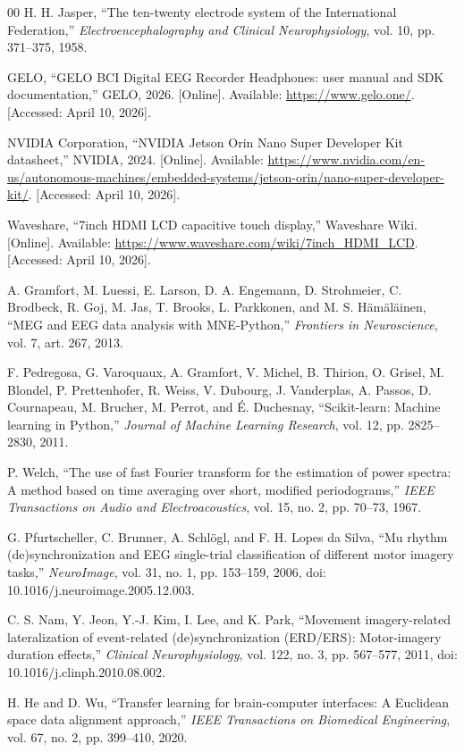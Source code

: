 \begin{thebibliography}{00}
H. H. Jasper, ``The ten-twenty electrode system of the International Federation,''
\textit{Electroencephalography and Clinical Neurophysiology}, vol. 10,
pp. 371--375, 1958.


GELO, ``GELO BCI Digital EEG Recorder Headphones: user manual and SDK
documentation,'' GELO, 2026. [Online]. Available: \url{https://www.gelo.one/}.
[Accessed: April 10, 2026].

NVIDIA Corporation, ``NVIDIA Jetson Orin Nano Super Developer Kit datasheet,'' NVIDIA,
2024. [Online]. Available:
\url{https://www.nvidia.com/en-us/autonomous-machines/embedded-systems/jetson-orin/nano-super-developer-kit/}.
[Accessed: April 10, 2026].


Waveshare, ``7inch HDMI LCD capacitive touch display,'' Waveshare Wiki. [Online].
Available: \url{https://www.waveshare.com/wiki/7inch_HDMI_LCD}.
[Accessed: April 10, 2026].

A. Gramfort, M. Luessi, E. Larson, D. A. Engemann, D. Strohmeier, C. Brodbeck,
R. Goj, M. Jas, T. Brooks, L. Parkkonen, and M. S. H\"{a}m\"{a}l\"{a}inen,
``MEG and EEG data analysis with MNE-Python,'' \textit{Frontiers in Neuroscience},
vol. 7, art. 267, 2013.

F. Pedregosa, G. Varoquaux, A. Gramfort, V. Michel, B. Thirion, O. Grisel,
M. Blondel, P. Prettenhofer, R. Weiss, V. Dubourg, J. Vanderplas, A. Passos,
D. Cournapeau, M. Brucher, M. Perrot, and \'{E}. Duchesnay, ``Scikit-learn:
Machine learning in Python,'' \textit{Journal of Machine Learning Research},
vol. 12, pp. 2825--2830, 2011.


P. Welch, ``The use of fast Fourier transform for the estimation of power spectra:
A method based on time averaging over short, modified periodograms,''
\textit{IEEE Transactions on Audio and Electroacoustics}, vol. 15, no. 2,
pp. 70--73, 1967.

G. Pfurtscheller, C. Brunner, A. Schl\"{o}gl, and F. H. Lopes da Silva, ``Mu rhythm
(de)synchronization and EEG single-trial classification of different motor imagery
tasks,'' \textit{NeuroImage}, vol. 31, no. 1, pp. 153--159, 2006,
doi: 10.1016/j.neuroimage.2005.12.003.

C. S. Nam, Y. Jeon, Y.-J. Kim, I. Lee, and K. Park, ``Movement imagery-related
lateralization of event-related (de)synchronization (ERD/ERS): Motor-imagery duration
effects,'' \textit{Clinical Neurophysiology}, vol. 122, no. 3, pp. 567--577, 2011,
doi: 10.1016/j.clinph.2010.08.002.

H. He and D. Wu, ``Transfer learning for brain-computer interfaces: A Euclidean space
data alignment approach,'' \textit{IEEE Transactions on Biomedical Engineering}, vol. 67,
no. 2, pp. 399--410, 2020.

\end{thebibliography}
